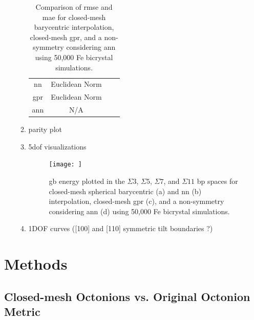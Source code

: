 \documentclass[preprint,12pt]{elsarticle}
\begin{document}
\begin{enumerate}
\begin{enumerate}
\begin{table}[]
\begin{tabular}{c c c c}
                 \acrshort{nn} & Euclidean Norm & & \\
                 \acrshort{gpr} & Euclidean Norm & & \\
                 \acrshort{ann} & N/A & &
            \end{tabular}
            \caption{Comparison of \acrfull{rmse} and \acrfull{mae} for closed-mesh barycentric interpolation, closed-mesh \acrlong{gpr}, and a non-symmetry considering \acrfull{ann} using 50,000 Fe bicrystal simulations.}
            \label{tab:restrepo-comp}
        \end{table}
        \item parity plot
        \item \gls{5dof} visualizations
        \begin{figure}
            \centering
            \texttt{[image: ]}
            \caption{\acrfull{gb} energy plotted in the $\Sigma{3}$, $\Sigma{5}$, $\Sigma{7}$, and $\Sigma{11}$ \acrlong{bp} spaces for closed-mesh spherical barycentric (a) and \acrlong{nn} (b) interpolation, closed-mesh \acrlong{gpr} (c), and a non-symmetry considering \acrlong{ann} (d) using 50,000 Fe bicrystal simulations.}
            \label{fig:restrepo-5dof}
        \end{figure}
        \item 1DOF curves ([100] and [110] symmetric tilt boundaries ?)
    \end{enumerate}
\end{enumerate}

\section{Methods} \label{sec:methods}

\subsection{Closed-mesh Octonions vs. Original Octonion Metric} \label{sec:methods:closed-mesh}
\end{document}

